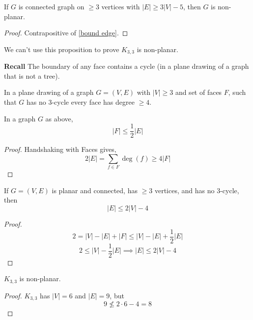 \begin{thmbox}
    \begin{prop}
        If $ G $ is connected graph on $ \geqslant 3 $ vertices
        with $ |E|\geqslant 3|V|-5 $, then $ G $ is non-planar.
    \end{prop}
\end{thmbox}
\begin{proof}
    Contrapositive of \ref{bound edge}.
\end{proof}
We can't use this proposition to prove $ K_{3,3} $ is non-planar.

\textbf{Recall} The boundary of any face contains a cycle (in a plane drawing
of a graph that is not a tree).

\begin{thmbox}
    \begin{corollary}
        In a plane drawing of a graph $ G=(V,E) $ with
        $ |V|\geqslant 3 $ and set of faces $ F $, such that
        $ G $ has no $3$-cycle every face
        has degree $ \geqslant 4 $.
    \end{corollary}
\end{thmbox}

\begin{thmbox}
    \begin{corollary}
        In a graph $ G $ as above,
        \[ |F|\leqslant \frac{1}{2} |E| \]
    \end{corollary}
\end{thmbox}
\begin{proof}
    Handshaking with Faces gives,
    \[ 2|E|=\sum\limits_{f\in F}\deg(f)\geqslant 4|F| \]
\end{proof}

\begin{thmbox}
    \begin{corollary}
        If $ G=(V,E) $ is planar and connected,
        has $ \geqslant 3 $ vertices, and has no
        $ 3 $-cycle, then
        \[ |E|\leqslant 2|V|-4 \]
    \end{corollary}
\end{thmbox}
\begin{proof}
    \[ 2=|V|-|E|+|F|\leqslant |V|-|E|+\frac{1}{2} |E| \]
    \[ 2\leqslant |V|-\frac{1}{2} |E|\implies |E|\leqslant 2|V|-4 \]
\end{proof}

\begin{thmbox}
    \begin{corollary}
        $ K_{3,3} $ is non-planar.
    \end{corollary}
\end{thmbox}
\begin{proof}
    $ K_{3,3} $ has $ |V|=6 $ and $ |E|=9 $, but
    \[ 9\nleqslant 2\cdot 6-4=8 \]
\end{proof}

